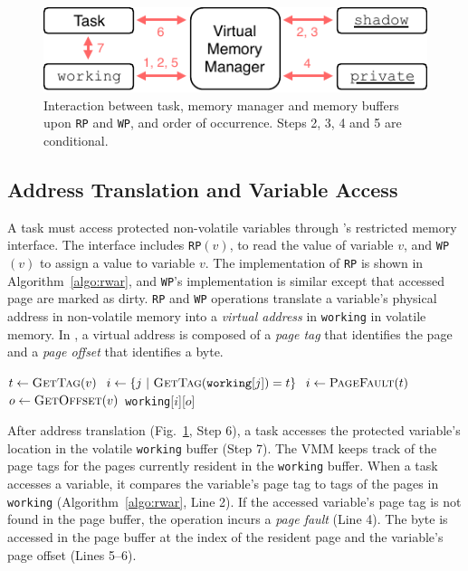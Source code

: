 \begin{figure}
    \centering
    \includegraphics[width=\columnwidth]{figures/mem-man.pdf}
    \caption{Interaction between task, memory manager and memory buffers upon \texttt{RP} and \texttt{WP}, and order of occurrence. Steps 2, 3, 4 and 5 are conditional.}
    \label{figure:mem-man}
\end{figure}

\subsection{Address Translation and Variable Access}

A task must access protected non-volatile variables through \sys's restricted memory interface.
The interface includes \texttt{RP}$(v)$, to read the value of variable $v$, and \texttt{WP}$(v)$ to assign a value to variable $v$.
The implementation of {\tt RP} is shown in Algorithm~\ref{algo:rwar}, and {\tt WP}'s implementation is similar except that accessed page are marked as dirty.
{\tt RP} and {\tt WP} operations translate a variable's physical address in non-volatile memory into a \emph{virtual address} in \texttt{working} in volatile memory.
In \sys, a virtual address is composed of a \emph{page tag} that identifies the page and a \emph{page offset} that identifies a byte.

\begin{algorithm}[t]
    \label{algo:rwar}
    \scriptsize
    \begin{algorithmic}[1]
		\State $t \leftarrow \Call{GetTag}{v}$
        \State $i \gets \{ j\ |\ \Call{GetTag}{\texttt{working}[j]} = t \}$ 
		 
		\State	$i \gets \Call{PageFault}{t}$ 
		\EndIf
		\State $o \leftarrow \Call{GetOffset}{v}$
		\State \Return \texttt{working}[$i$][$o$]  
	\end{algorithmic}
\end{algorithm}

After address translation (Fig.~\ref{figure:mem-man}, Step 6), a task accesses the protected variable's location in the volatile \texttt{working} buffer (Step 7). The VMM keeps track of the page tags for the pages currently resident in the \texttt{working} buffer. When a task accesses a variable, it compares the variable's page tag to tags of the pages in {\tt working} (Algorithm~\ref{algo:rwar}, Line 2). If the accessed variable's page tag is not found in the page buffer, the operation incurs a {\em page fault} (Line 4). The byte is accessed in the page buffer at the index of the resident page and the variable's page offset (Lines 5--6).

